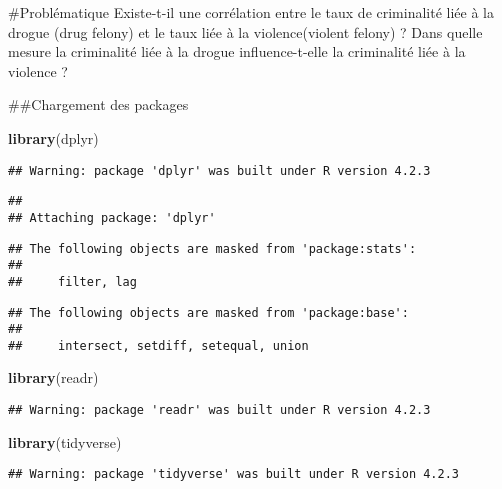 \documentclass[
]{article}
\newenvironment{Shaded}{\begin{snugshade}}{\end{snugshade}}
\newcommand{\FunctionTok}[1]{\textcolor[rgb]{0.13,0.29,0.53}{\textbf{#1}}}
\newcommand{\NormalTok}[1]{#1}
\begin{document}
\#Problématique Existe-t-il une corrélation entre le taux de criminalité
liée à la drogue (drug felony) et le taux liée à la violence(violent
felony) ? Dans quelle mesure la criminalité liée à la drogue
influence-t-elle la criminalité liée à la violence ?

\#\#Chargement des packages

\begin{Shaded}
\begin{Highlighting}[]
\FunctionTok{library}\NormalTok{(dplyr)}
\end{Highlighting}
\end{Shaded}

\begin{verbatim}
## Warning: package 'dplyr' was built under R version 4.2.3
\end{verbatim}

\begin{verbatim}
## 
## Attaching package: 'dplyr'
\end{verbatim}

\begin{verbatim}
## The following objects are masked from 'package:stats':
## 
##     filter, lag
\end{verbatim}

\begin{verbatim}
## The following objects are masked from 'package:base':
## 
##     intersect, setdiff, setequal, union
\end{verbatim}

\begin{Shaded}
\begin{Highlighting}[]
\FunctionTok{library}\NormalTok{(readr)}
\end{Highlighting}
\end{Shaded}

\begin{verbatim}
## Warning: package 'readr' was built under R version 4.2.3
\end{verbatim}

\begin{Shaded}
\begin{Highlighting}[]
\FunctionTok{library}\NormalTok{(tidyverse)}
\end{Highlighting}
\end{Shaded}

\begin{verbatim}
## Warning: package 'tidyverse' was built under R version 4.2.3
\end{verbatim}
\end{document}
